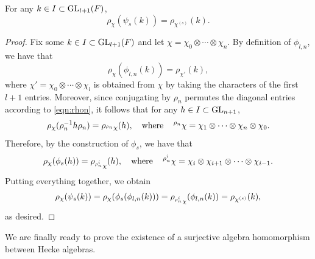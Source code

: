
    \begin{lemma}\label{lem_compatible-rho}
        For any $k\in I\subset\mathrm{GL}_{l+1}(F)$, 
        $$\rho_\chi(\psi_s(k))=\rho_{\chi^{(s)}}(k).$$
    \end{lemma}
    \begin{proof}
        Fix some $k\in I\subset\mathrm{GL}_{l+1}(F)$ and let $\chi=\chi_0\otimes\cdots\otimes\chi_n$.
        By definition of $\phi_{l,n}$, we have that
        $$\rho_\chi(\phi_{l,n}(k))=\rho_{\chi'}(k),$$
        where $\chi'=\chi_0\otimes\cdots\otimes\chi_l$ is obtained from $\chi$ by taking the characters of the first $l+1$ entries. Moreover, since conjugating by $\rho_n$ permutes the diagonal entries according to \eqref{eqn:rhon}, it follows that for any $h\in I\subset\mathrm{GL}_{n+1}$, 
        $$\rho_\chi(\rho_n^{-1}h\rho_n)=\rho_{\prescript{\rho_n}{}{\chi}}(h),\quad\text{where}\quad\prescript{\rho_n}{}{\chi}=\chi_1\otimes\cdots\otimes\chi_n\otimes\chi_0.$$
        Therefore, by the construction of $\phi_s$, we have that 
        $$\rho_\chi(\phi_s(h))=\rho_{\prescript{\rho_n^i}{}{\chi}}(h),\quad\text{where}\quad\prescript{\rho_n^i}{}{\chi}=\chi_i\otimes\chi_{i+1}\otimes\cdots\otimes\chi_{i-1}.$$
        Putting everything together, we obtain
        $$\rho_\chi(\psi_s(k))=\rho_\chi(\phi_s(\phi_{l,n}(k)))=\rho_{\prescript{\rho_n^i}{}{\chi}}(\phi_{l,n}(k))=\rho_{\chi^{(s)}}(k),$$
        as desired.
    \end{proof}

    We are finally ready to prove the existence of a surjective algebra homomorphism between Hecke algebras.

